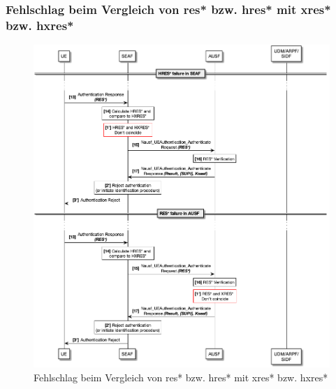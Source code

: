 \subsubsection{Fehlschlag beim Vergleich von \gls{res*} bzw. \gls{hres*} mit \gls{xres*} bzw. \gls{hxres*}}

\begin{figure}[H]
  \centering
  \includegraphics[width=\textwidth]{uml/protocol_res*_verification_failure_v1.png}
  \caption{Fehlschlag beim Vergleich von \gls{res*} bzw. \gls{hres*} mit \gls{xres*} bzw. \gls{hxres*}}
  \label{fig:protocol_res*_verification_failure_v1}
\end{figure}















